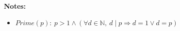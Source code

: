 \documentclass[12pt]{article}
\begin{document}
\begin{enumerate}[a.]
\begin{mdframed}
    \end{mdframed}

    \bigskip

    \textbf{Notes:}

    \begin{itemize}
        \item $Prime(p):\:p > 1 \land (\forall d \in \mathbb{N},\:d \mid p \Rightarrow d = 1 \lor d = p)$
    \end{itemize}
\end{enumerate}
\end{document}
